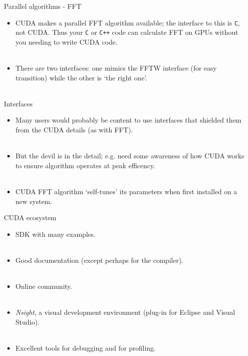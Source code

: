 \documentclass[usenames,dvipsnames]{beamer}
\begin{document}
\begin{frame}{Parallel algorithms - FFT}
  \begin{block}{}
    \begin{itemize}
      \item{CUDA makes a parallel FFT algorithm available; the interface to this is \texttt{C}, not CUDA. Thus your \texttt{C} or \texttt{C++} code can calculate FFT on GPUs without you needing to write CUDA code.}\\~\
      \item{There are two interfaces: one mimics the FFTW interface (for easy transition) while the other is `the right one'.}\\~\
    \end{itemize}
  \end{block}
\end{frame}

\begin{frame}{Interfaces}
  \begin{block}{}
    \begin{itemize}
      \item{Many users would probably be content to use interfaces that shielded them from the CUDA details (as with FFT).}\\~\
      \item{But the devil is in the detail; e.g. need some awareness of how CUDA works to ensure algorithm operates at peak efficency.}\\~\
      \item{CUDA FFT algorithm `self-tunes' its parameters when first installed on a new system.}
    \end{itemize}
  \end{block}
\end{frame}

\begin{frame}{CUDA ecosystem}
  \begin{block}{}
    \begin{itemize}
      \item{SDK with many examples.}\\~\
      \item{Good documentation (except perhaps for the compiler).}\\~\
      \item{Online community.}\\~\
      \item{\textit{Nsight}, a visual development environment (plug-in for Eclipse and Visual Studio).}\\~\
      \item{Excellent tools for debugging and for profiling.}
    \end{itemize}
  \end{block}
\end{frame}
\end{document}
